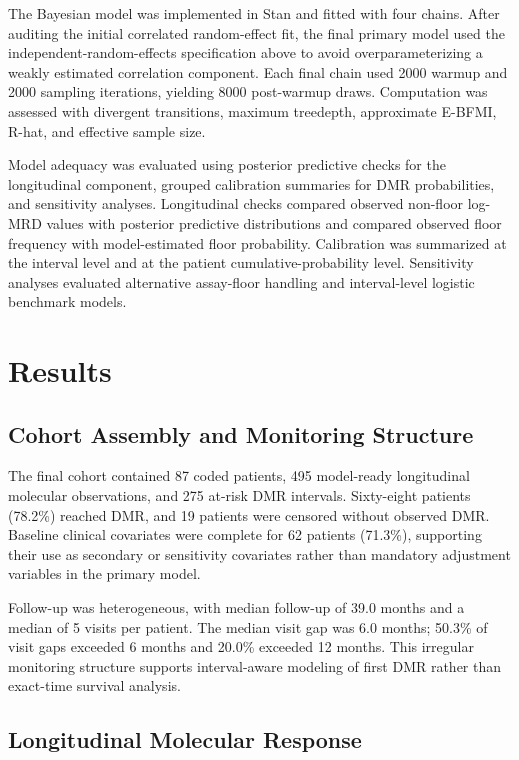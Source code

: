 \documentclass[11pt]{article}
\begin{document}
The Bayesian model was implemented in Stan and fitted with four chains. After auditing the initial correlated random-effect fit, the final primary model used the independent-random-effects specification above to avoid overparameterizing a weakly estimated correlation component. Each final chain used 2000 warmup and 2000 sampling iterations, yielding 8000 post-warmup draws. Computation was assessed with divergent transitions, maximum treedepth, approximate E-BFMI, R-hat, and effective sample size.

Model adequacy was evaluated using posterior predictive checks for the longitudinal component, grouped calibration summaries for DMR probabilities, and sensitivity analyses. Longitudinal checks compared observed non-floor log-MRD values with posterior predictive distributions and compared observed floor frequency with model-estimated floor probability. Calibration was summarized at the interval level and at the patient cumulative-probability level. Sensitivity analyses evaluated alternative assay-floor handling and interval-level logistic benchmark models.

\section{Results}

\subsection{Cohort Assembly and Monitoring Structure}

The final cohort contained 87 coded patients, 495 model-ready longitudinal molecular observations, and 275 at-risk DMR intervals. Sixty-eight patients (78.2\%) reached DMR, and 19 patients were censored without observed DMR. Baseline clinical covariates were complete for 62 patients (71.3\%), supporting their use as secondary or sensitivity covariates rather than mandatory adjustment variables in the primary model.



Follow-up was heterogeneous, with median follow-up of 39.0 months and a median of 5 visits per patient. The median visit gap was 6.0 months; 50.3\% of visit gaps exceeded 6 months and 20.0\% exceeded 12 months. This irregular monitoring structure supports interval-aware modeling of first DMR rather than exact-time survival analysis.

\subsection{Longitudinal Molecular Response}
\end{document}
